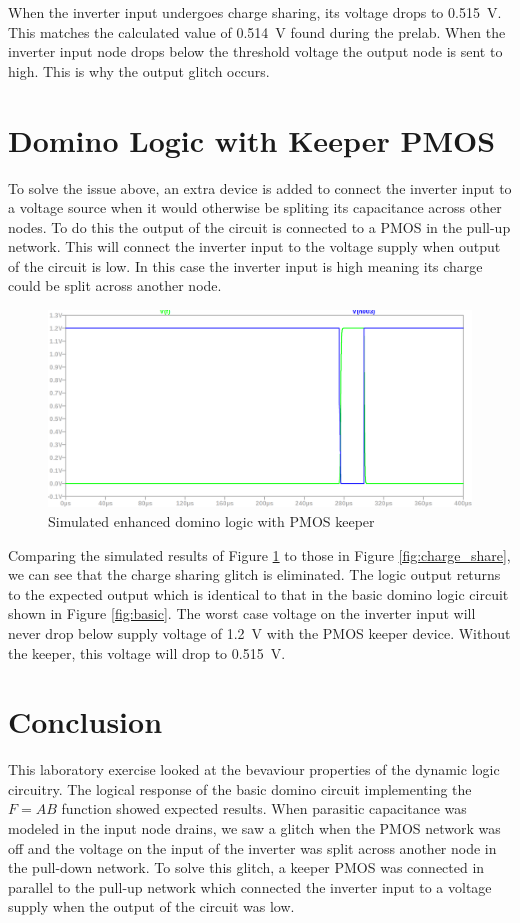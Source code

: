 \documentclass[CMPE]{../KGCOEReport}
\begin{document}
	When the inverter input undergoes charge sharing, its voltage drops to
	\SI{0.515}{\volt}. This matches the calculated value of \SI{.514}{\volt} found
	during the prelab. When the inverter input node drops below the threshold voltage
	the output node is sent to high. This is why the output glitch occurs.

	\section*{Domino Logic with Keeper PMOS}

	To solve the issue above, an extra device is added to connect the inverter input
	to a voltage source when it would otherwise be spliting its capacitance across other
	nodes. To do this the output of the circuit is connected to a PMOS in the pull-up
	network. This will connect the inverter input to the voltage supply when output of
	the circuit is low. In this case the inverter input is high meaning its charge could
	be split across another node.

	\begin{figure}[h!]
       \centering
       \includegraphics[width=5.5in]{img/enhanced_domino.png}
       \caption{Simulated enhanced domino logic with PMOS keeper}
       \label{fig:enhanced}
	 \end{figure}

	Comparing the simulated results of Figure \ref{fig:enhanced} to those in Figure
	\ref{fig:charge_share}, we can see that the charge sharing glitch is eliminated.
	The logic output returns to the expected output which is identical to that in the
	basic domino logic circuit shown in Figure \ref{fig:basic}. The worst case voltage
	on the inverter input will never drop below supply voltage of \SI{1.2}{\volt} with
	the PMOS keeper device. Without the keeper, this voltage will drop to
	\SI{0.515}{\volt}.

	\section*{Conclusion}

	This laboratory exercise looked at the bevaviour properties of the dynamic logic
	circuitry. The logical response of the basic domino circuit implementing the $F=AB$
	function showed expected results. When parasitic capacitance was modeled in the
	input node drains, we saw a glitch when the PMOS network was off and the voltage
	on the input of the inverter was split across another node in the pull-down network.
	To solve this glitch, a keeper PMOS was connected in parallel to the pull-up network
	which connected the inverter input to a voltage supply when the output of the circuit
	was low.
\end{document}

